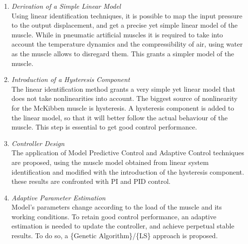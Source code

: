 \begin{enumerate}
	\item \textit{Derivation of a Simple Linear Model} \smallskip \\ 
	Using linear identification techniques, it is possible to map the input pressure to the output displacement,
	and get a precise yet simple linear model of the muscle.
	While in pneumatic artificial muscles it is required to take into account
	the temperature dynamics and the compressibility of air, using water as the muscle
	allows to disregard them. This grants a simpler model of the muscle.
	
	\item \textit{Introduction of a Hysteresis Component} \smallskip \\ 
	The linear identification method grants a very simple yet linear model
	that does not take nonlinearities into account. 
	The biggest source of nonlinearity for the McKibben muscle is hysteresis.
	A hysteresis component is added to the linear model, 
	so that it will	better follow the actual behaviour of the muscle.
	This step is essential to get good control performance.
	
	\item \textit{Controller Design} \smallskip \\
	The application of Model Predictive Control and Adaptive Control techniques are
	proposed, using the muscle model obtained from linear system identification and
	modified with the introduction of the hysteresis component.
	these results are confronted with PI and PID control.
	
	\item \textit{Adaptive Parameter Estimation} \smallskip \\
	Model's parameters change according to the load of the muscle
	and its working conditions. To retain good control performance,
	an adaptive estimation is needed to update the controller, and achieve
	perpetual stable results. To do so, a \{Genetic Algorithm\}/\{LS\} approach is proposed.
\end{enumerate}









